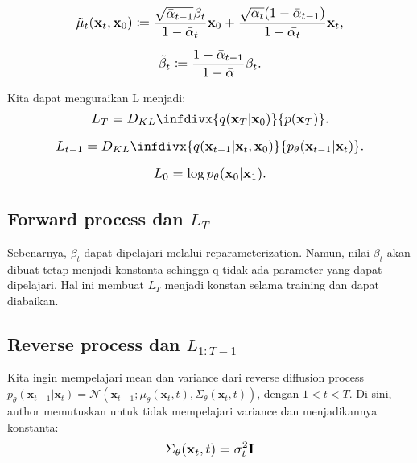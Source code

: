 \documentclass{article}
\newcommand{\infdiv}{D_{KL}\infdivx}
\newcommand*{\Scale}[2][4]{\scalebox{#1}{\ensuremath{#2}}}
\begin{document}
\begin{equation}
\Scale[1.2]{ \displaystyle
\tilde{\mu}_t(\textbf{x}_{t},\textbf{x}_0) \coloneq \frac{
\sqrt{\bar{\alpha}_{t-1}}\beta_t
}
{
1 - \bar{\alpha}_t
}
\textbf{x}_0 
+
\frac{
\sqrt{\alpha_{t}}(1-\bar{\alpha}_{t-1})
}
{
1 - \bar{\alpha_t}
}
\textbf{x}_t, }
\end{equation}

\begin{equation}
\Scale[1.2]{ \displaystyle
\tilde{\beta}_t \coloneq 
\frac{
1-\bar{\alpha}_{t-1}
}
{
1-\bar{\alpha}
}
\beta_t. }
\end{equation}

Kita dapat menguraikan L menjadi:
\begin{equation}
\Scale[1.2]{ \displaystyle
L_T = 
\infdiv{q(\textbf{x}_T|\textbf{x}_0)}{p(\textbf{x}_T)}. }
\end{equation}

\begin{equation}
\Scale[1.2]{ \displaystyle
L_{t-1} = 
\infdiv{ 
q(\textbf{x}_{t-1}|\textbf{x}_t,\textbf{x}_0)
}
{
p_\theta(\textbf{x}_{t-1}|\textbf{x}_{t})
}. }
\end{equation}

\begin{equation}
\Scale[1.2]{ \displaystyle
L_{0} = 
\log p_\theta(\textbf{x}_0|\textbf{x}_1). }
\end{equation}


\subsection{Forward process dan $ L_T $}
Sebenarnya, $ \beta_t $ dapat dipelajari melalui reparameterization. Namun, nilai $ \beta_t $ akan dibuat tetap menjadi konstanta sehingga q tidak ada parameter yang dapat dipelajari. Hal ini membuat $ L_T $ menjadi konstan selama training dan dapat diabaikan.


\subsection{Reverse process dan $ L_{1:T-1} $}
Kita ingin mempelajari mean dan variance dari reverse diffusion process $ p_\theta(\textbf{x}_{t-1}|\textbf{x}_{t}) = \mathscr{N}(\textbf{x}_{t-1};\mu_\theta(\textbf{x}_{t},t),\Sigma_\theta(\textbf{x}_t, t)) $, dengan $ 1 < t < T  $. Di sini, author memutuskan untuk tidak mempelajari variance dan menjadikannya konstanta:
\begin{equation}
\Scale[1.2]{ \displaystyle
\Sigma_\theta(\textbf{x}_t, t) = \sigma_t^2 \textbf{I} }
\end{equation}
\end{document}
